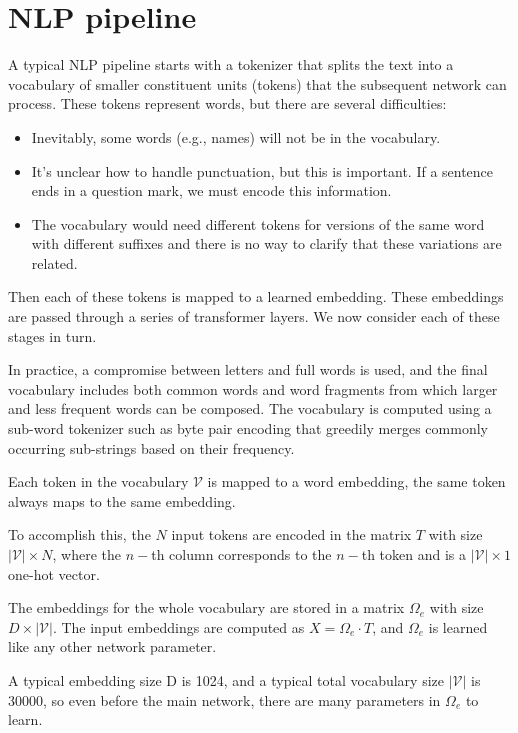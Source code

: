 \section{NLP pipeline}
A typical NLP pipeline starts with a tokenizer that splits the text into a vocabulary of smaller constituent units 
(tokens) that the subsequent network can process. These tokens represent words, but there are several difficulties: 
\begin{itemize}
    \item Inevitably, some words (e.g., names) will not be in the vocabulary. 
    \item It's unclear how to handle punctuation, but this is important. If a sentence ends in a question mark, we must 
        encode this information. 
    \item The vocabulary would need different tokens for versions of the same word with different suffixes and there is
        no way to clarify that these variations are related. 
\end{itemize}

Then each of these tokens is mapped to a learned embedding. These embeddings are passed through a series of transformer 
layers. We now consider each of these stages in turn.

In practice, a compromise between letters and full words is used, and the final vocabulary includes both common words and 
word fragments from which larger and less frequent words can be composed. The vocabulary is computed using a sub-word 
tokenizer such as byte pair encoding that greedily merges commonly occurring sub-strings based on their frequency.

Each token in the vocabulary $\mathcal{V}$ is mapped to a word embedding, the same token always maps to the same 
embedding. 

To accomplish this, the $N$ input tokens are encoded in the matrix $T$ with size $|\mathcal{V}| \times N$, where the 
$n-$th column corresponds to the $n-$th token and is a $|\mathcal{V}| \times 1$ one-hot vector. 

The embeddings for the whole vocabulary are stored in a matrix $\Omega_e$ with size $D \times |\mathcal{V}|$. The input 
embeddings are computed as $X = \Omega_e \cdot T$, and $\Omega_e$ is learned like any other network parameter. 

A typical embedding size D is 1024, and a typical total vocabulary size $|\mathcal{V}|$ is 30000, so even before the main 
network, there are many parameters in $\Omega_e$ to learn.

